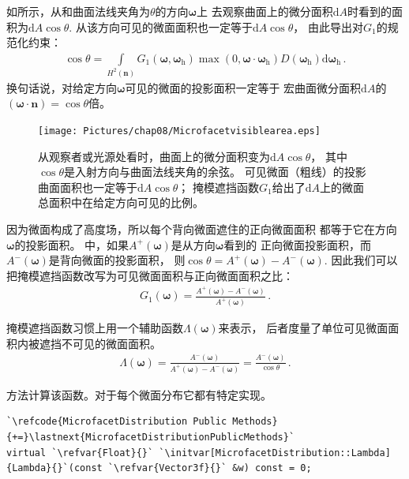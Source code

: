 如所示，从和曲面法线夹角为$\theta$的方向$\bm\omega$上
去观察曲面上的微分面积$\mathrm{d}A$时看到的面积为$\mathrm{d}A\cos\theta$.
从该方向可见的微面面积也一定等于$\mathrm{d}A\cos\theta$，
由此导出对$G_1$的规范化约束：
\begin{align}
    \label{eq:8.12}
    \cos\theta=\int\limits_{H^2({\bm n})}G_1({\bm\omega},{\bm\omega}_{\mathrm{h}})\max(0,{\bm\omega}\cdot{\bm\omega}_{\mathrm{h}})D({\bm\omega}_{\mathrm{h}})\mathrm{d}{\bm\omega}_{\mathrm{h}}\, .
\end{align}
换句话说，对给定方向$\bm\omega$可见的微面的投影面积一定等于
宏曲面微分面积$\mathrm{d}A$的$({\bm\omega}\cdot{\bm n})=\cos\theta$倍。

\begin{figure}[htbp]
    \centering
    \texttt{[image: Pictures/chap08/Microfacetvisiblearea.eps]}
    \caption{从观察者或光源处看时，曲面上的微分面积变为$\mathrm{d}A\cos\theta$，
        其中$\cos\theta$是入射方向与曲面法线夹角的余弦。
        可见微面（粗线）的投影曲面面积也一定等于$\mathrm{d}A\cos\theta$；
        掩模遮挡函数$G_1$给出了$\mathrm{d}A$上的微面总面积中在给定方向可见的比例。}
    \label{fig:8.17}
\end{figure}

因为微面构成了高度场，所以每个背向微面遮住的正向微面面积
都等于它在方向$\bm\omega$的投影面积。
中，如果$A^{+}({\bm\omega})$是从方向$\bm\omega$看到的
正向微面投影面积，而$A^{-}({\bm\omega})$是背向微面的投影面积，
则$\cos\theta=A^{+}({\bm\omega})-A^{-}({\bm\omega})$.
因此我们可以把掩模遮挡函数改写为可见微面面积与正向微面面积之比：
\begin{align*}
    G_1({\bm\omega})=\frac{A^{+}({\bm\omega})-A^{-}({\bm\omega})}{A^{+}({\bm\omega})}\, .
\end{align*}

掩模遮挡函数习惯上用一个辅助函数$\Lambda({\bm\omega})$来表示，
后者度量了单位可见微面面积内被遮挡不可见的微面面积。
\begin{align}
    \label{eq:8.13}
    \Lambda({\bm\omega})=\frac{A^{-}({\bm\omega})}{A^{+}({\bm\omega})-A^{-}({\bm\omega})}=\frac{A^{-}({\bm\omega})}{\cos\theta}\, .
\end{align}

方法计算该函数。对于每个微面分布它都有特定实现。
\begin{lstlisting}
`\refcode{MicrofacetDistribution Public Methods}{+=}\lastnext{MicrofacetDistributionPublicMethods}`
virtual `\refvar{Float}{}` `\initvar[MicrofacetDistribution::Lambda]{Lambda}{}`(const `\refvar{Vector3f}{}` &w) const = 0;
\end{lstlisting}


